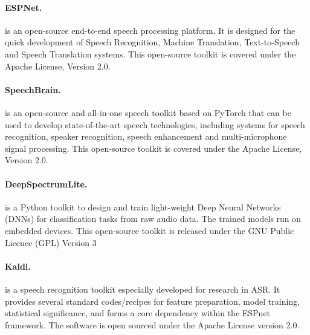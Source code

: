 \documentclass{article}
\begin{document}
\paragraph{ESPNet.} \citep{espnet, espnetst} is an open-source end-to-end speech processing platform. It is designed for the quick development of Speech Recognition, Machine Translation, Text-to-Speech and Speech Translation systems. This open-source toolkit is covered under the Apache License, Version 2.0. 
\paragraph{SpeechBrain.} \citep{speechbrain} is an open-source and all-in-one speech toolkit based on PyTorch that can be used to develop state-of-the-art speech technologies, including systems for speech recognition, speaker recognition, speech enhancement and multi-microphone signal processing. This open-source toolkit is covered under the Apache License, Version 2.0.  
\paragraph{DeepSpectrumLite.} \citep{deepspectrumlite}  is a Python toolkit to design and train light-weight Deep Neural Networks (DNNs) for classification tasks from raw audio data. The trained models run on embedded devices. This open-source toolkit is released under the GNU Public Licence (GPL) Version 3
\paragraph{Kaldi.} \citep{kaldi} is a speech recognition toolkit especially developed for research in ASR. It provides several standard codes/recipes for feature preparation, model training, statistical significance, and forms a core dependency within the ESPnet framework. The software is open sourced under the Apache License version 2.0. 
\end{document}

